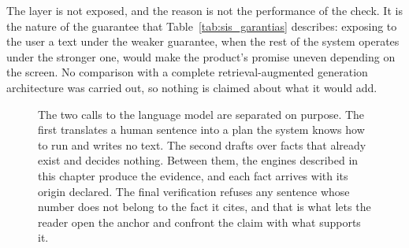 The layer is not exposed, and the reason is not the performance of the check. It is the nature of
the guarantee that Table~\ref{tab:sis_garantias} describes: exposing to the user a text under the
weaker guarantee, when the rest of the system operates under the stronger one, would make the
product's promise uneven depending on the screen. No comparison with a complete
retrieval-augmented generation architecture was carried out, so nothing is claimed about what it
would add.

\begin{figure}[htbp]
\centering
{}
\caption[The traversal from a question to the fact that supports it]{The two calls to the language model are separated on purpose. The first translates a human sentence into a plan the system knows how to run and writes no text. The second drafts over facts that already exist and decides nothing. Between them, the engines described in this chapter produce the evidence, and each fact arrives with its origin declared. The final verification refuses any sentence whose number does not belong to the fact it cites, and that is what lets the reader open the anchor and confront the claim with what supports it.}
\label{fig:sis_inteligencia}
\end{figure}
